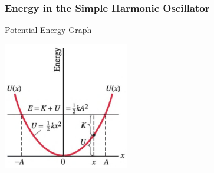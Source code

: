 \documentclass[]{beamer}
\begin{document}

\begin{frame}
\frametitle{Energy in the Simple Harmonic Oscillator}



Potential Energy Graph

\vspace{5mm}

    \begin{center}
  \includegraphics[height=2.2in]{images3/energy2.jpg}
\end{center}
\end{frame}


\end{document}
